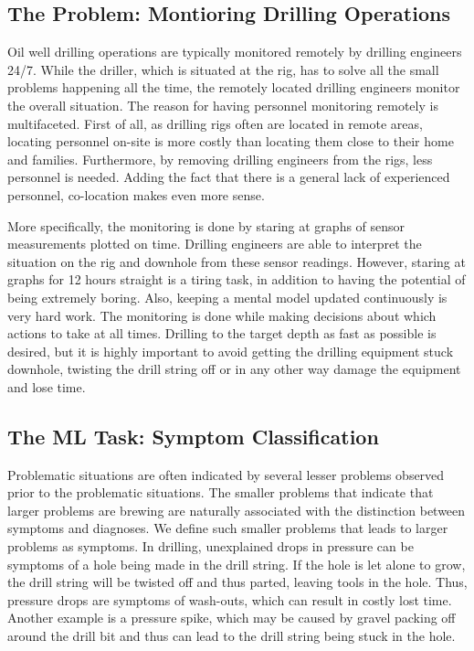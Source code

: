 \documentclass{article}
\begin{document}
\subsection{The Problem: Montioring Drilling Operations}
Oil well drilling operations are typically monitored remotely by drilling engineers 24/7.
While the driller, which is situated at the rig, has to solve all the small problems happening all the time, the remotely located drilling engineers monitor the overall situation.
The reason for having personnel monitoring remotely is multifaceted.
First of all, as drilling rigs often are located in remote areas, locating personnel on-site is more costly than locating them close to their home and families.
Furthermore, by removing drilling engineers from the rigs, less personnel is needed.
Adding the fact that there is a general lack of experienced personnel, co-location makes even more sense.

More specifically, the monitoring is done by staring at graphs of sensor measurements plotted on time.
Drilling engineers are able to interpret the situation on the rig and downhole from these sensor readings.
However, staring at graphs for 12 hours straight is a tiring task, in addition to having the potential of being extremely boring.
Also, keeping a mental model updated continuously is very hard work.
The monitoring is done while making decisions about which actions to take at all times.
Drilling to the target depth as fast as possible is desired, but it is highly important to avoid getting the drilling equipment stuck downhole, twisting the drill string off or in any other way damage the equipment and lose time. 

\subsection{The ML Task: Symptom Classification}
Problematic situations are often indicated by several lesser problems observed prior to the problematic situations.
The smaller problems that indicate that larger problems are brewing are naturally associated with the distinction between symptoms and diagnoses.
We define such smaller problems that leads to larger problems as symptoms.
In drilling, unexplained drops in pressure can be symptoms of a hole being made in the drill string.
If the hole is let alone to grow, the drill string will be twisted off and thus parted, leaving tools in the hole.
Thus, pressure drops are symptoms of wash-outs, which can result in costly lost time.
Another example is a pressure spike, which may be caused by gravel packing off around the drill bit and thus can lead to the drill string being stuck in the hole.
\end{document}
